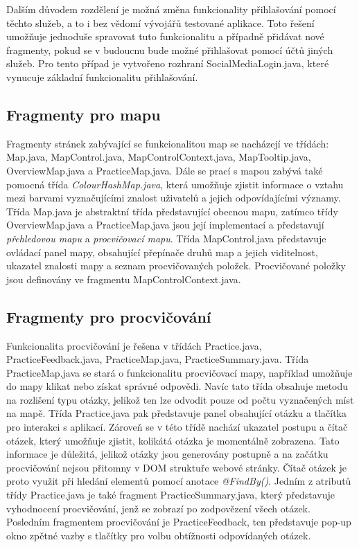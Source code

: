 \documentclass[
    color,   %
	table,   %
    twoside, %
    nolot, nolof
]{fithesis3}
\begin{document}
Dalším důvodem rozdělení je možná změna funkcionality přihlašování pomocí těchto služeb, a to i bez vědomí vývojářů testované aplikace. Toto řešení umožňuje jednoduše spravovat tuto funkcionalitu a případně přidávat nové fragmenty, pokud se v budoucnu bude možné přihlašovat pomocí účtů jiných služeb. Pro tento případ je vytvořeno rozhraní SocialMediaLogin.java, které vynucuje základní funkcionalitu přihlašování.

\subsection*{Fragmenty pro mapu}
Fragmenty stránek zabývající se funkcionalitou map se nacházejí ve třídách: Map.java, MapControl.java, MapControlContext.java, MapTooltip.java, OverviewMap.java a PracticeMap.java. Dále se prací s mapou zabývá také pomocná třída \emph{ColourHashMap.java}, která umožňuje zjistit informace o vztahu mezi barvami vyznačujícími znalost uživatelů a jejich odpovídajícími významy. Třída Map.java je abstraktní třída představující obecnou mapu, zatímco třídy OverviewMap.java a PracticeMap.java jsou její implementací a představují \emph{přehledovou mapu} a \emph{procvičovací mapu}. Třída MapControl.java představuje ovládací panel mapy, obsahující přepínače druhů map a jejich viditelnost, ukazatel znalosti mapy a seznam procvičovaných položek. Procvičované položky jsou definovány ve fragmentu MapControlContext.java.

\subsection*{Fragmenty pro procvičování}
Funkcionalita procvičování je řešena v třídách Practice.java, PracticeFeedback.java, PracticeMap.java, PracticeSummary.java. Třída PracticeMap.java se stará o funkcionalitu procvičovací mapy, například umožňuje do mapy klikat nebo získat správné odpovědi. Navíc tato třída obsahuje metodu na rozlišení typu otázky, jelikož ten lze odvodit pouze od počtu vyznačených míst na mapě. Třída Practice.java pak představuje panel obsahující otázku a tlačítka pro interakci s aplikací. Zároveň se v této třídě nachází ukazatel postupu a čítač otázek, který umožňuje zjistit, kolikátá otázka je momentálně zobrazena. Tato informace je důležitá, jelikož otázky jsou generovány postupně a na začátku procvičování nejsou přitomny v DOM struktuře webové stránky. Čítač otázek je proto využit při hledání elementů pomocí anotace \emph{@FindBy()}. Jedním z atributů třídy Practice.java je také fragment PracticeSummary.java, který představuje vyhodnocení procvičování, jenž se zobrazí po zodpovězení všech otázek. Posledním fragmentem procvičování je PracticeFeedback, ten představuje pop-up okno zpětné vazby s tlačítky pro volbu obtížnosti odpovídaných otázek.
\end{document}
